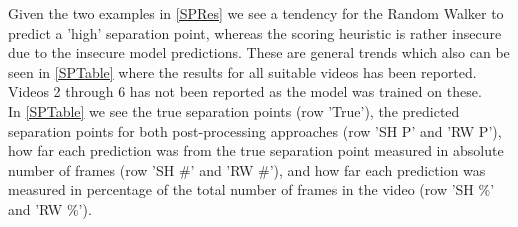 Given the two examples in \autoref{SPRes} we see a tendency for the Random Walker to predict a 'high' separation point, whereas the scoring heuristic is rather insecure due to the insecure model predictions. These are general trends which also can be seen in \autoref{SPTable} where the results for all suitable videos has been reported. Videos 2 through 6 has not been reported as the model was trained on these.\\ 
In \autoref{SPTable} we see the true separation points (row 'True'), the predicted separation points for both post-processing approaches (row 'SH P' and 'RW P'), how far each prediction was from the true separation point measured in absolute number of frames (row 'SH \#' and 'RW \#'), and how far each prediction was measured in percentage of the total number of frames in the video (row 'SH \%' and 'RW \%').

